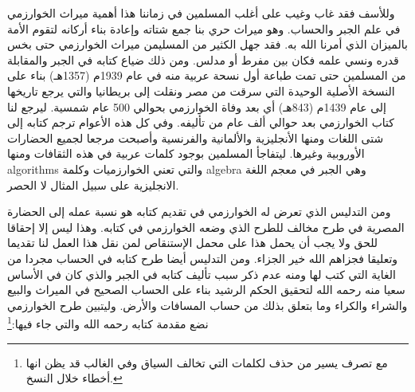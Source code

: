 وللأسف فقد غاب وغيب على أغلب المسلمين في زماننا هذا أهمية ميراث الخوارزمي في علم الجبر والحساب. وهو ميراث حري بنا جمع شتاته وإعادة بناء أركانه لتقوم الأمة بالميزان الذي أمرنا الله به. فقد جهل الكثير من المسليمن ميراث الخوارزمي حتى بخس قدره ونسي علمه فكان بين مفرط أو مدلس. ومن ذلك ضياع كتابه في الجبر والمقابلة من المسلمين حتى تمت طباعة أول نسحة عربية منه في عام 1939م (1357هـ) بناء على النسخة الأصلية الوحيدة التي سرقت من مصر ونقلت إلى بريطانيا والتي يرجع تاريخها إلى عام 1439م (843هـ) أي بعد وفاة الخوارزمي بحوالي 500 عام شمسية.
ليرجع لنا كتاب الخوارزمي بعد حوالي ألف عام من تأليفه.
وفي كل هذه الأعوام ترجم كتابه إلى شتى اللغات ومنها الأنجليزية والألمانية والفرنسية وأصبحت مرجعا لجميع الحضارات الأوروبية وغيرها.
ليتفاجأ المسلمين بوجود كلمات عربية في هذه الثقافات ومنها algorithms والتي تعني الخوارزميات وكلمة algebra وهي الجبر في معجم اللغة الانجليزية على سبيل المثال لا الحصر.

ومن التدليس الذي تعرض له الخوارزمي في تقديم كتابه هو نسبة عمله إلى الحضارة المصرية في طرح مخالف للطرح الذي وضعه الخوارزمي في كتابه. وهذا ليس إلا إحقاقا للحق ولا يجب أن يحمل هذا على محمل الإستنقاص لمن نقل هذا العمل لنا تقديما وتعليقا فجزاهم الله خير الجزاء. ومن التدليس أيضا طرح كتابه في الحساب مجردا من الغاية التي كتب لها ومنه عدم ذكر سبب تأليف كتابه في الجبر والذي كان في الأساس سعيا منه رحمه الله لتحقيق الحكم الرشيد بناء على الحساب الصحيح في الميراث والبيع والشراء والكراء وما بتعلق بذلك من حساب المسافات والأرض. وليتبين طرح الخوارزمي نضع مقدمة كتابه رحمه الله والتي جاء فيها:\footnote{مع تصرف يسير من حذف لكلمات التي تخالف السياق وفي الغالب قد يظن انها أخطاء خلال النسخ.}

